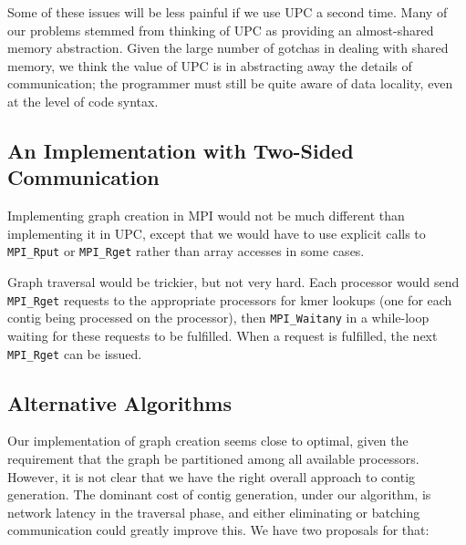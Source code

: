 \documentclass{article}
\begin{document}
Some of these issues will be less painful if we use UPC a second time.  Many of our problems stemmed from thinking of UPC as providing an almost-shared memory abstraction.  Given the large number of gotchas in dealing with shared memory, we think the value of UPC is in abstracting away the details of communication; the programmer must still be quite aware of data locality, even at the level of code syntax.

\subsection{An Implementation with Two-Sided Communication}
Implementing graph creation in MPI would not be much different than implementing it in UPC, except that we would have to use explicit calls to \texttt{MPI\_Rput} or \texttt{MPI\_Rget} rather than array accesses in some cases.

Graph traversal would be trickier, but not very hard.  Each processor would send \texttt{MPI\_Rget} requests to the appropriate processors for kmer lookups (one for each contig being processed on the processor), then \texttt{MPI\_Waitany} in a while-loop waiting for these requests to be fulfilled.  When a request is fulfilled, the next \texttt{MPI\_Rget} can be issued.

\subsection{Alternative Algorithms}
Our implementation of graph creation seems close to optimal, given the requirement that the graph be partitioned among all available processors.  However, it is not clear that we have the right overall approach to contig generation.  The dominant cost of contig generation, under our algorithm, is network latency in the traversal phase, and either eliminating or batching communication could greatly improve this.  We have two proposals for that:
\end{document}
